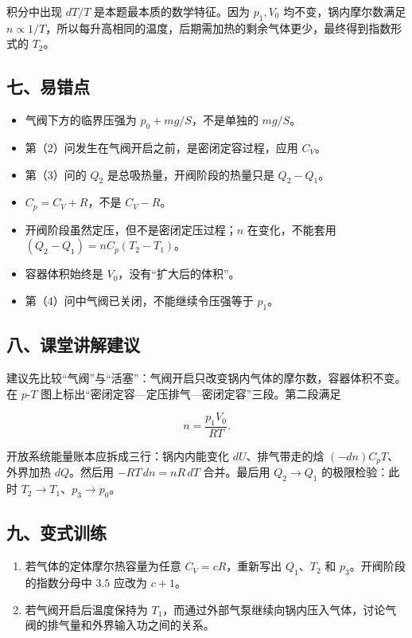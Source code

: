 \documentclass[12pt,a4paper,UTF8]{ctexart}
\newcommand{\tightlist}{\setlength{\itemsep}{0pt}\setlength{\parskip}{0pt}}
\begin{document}
积分中出现 \(dT/T\) 是本题最本质的数学特征。因为 \(p_1,V_0\)
均不变，锅内摩尔数满足
\(n\propto1/T\)，所以每升高相同的温度，后期需加热的剩余气体更少，最终得到指数形式的
\(T_2\)。

\subsection{七、易错点}\label{ux4e03ux6613ux9519ux70b9-5}

\begin{itemize}
\tightlist
\item
  气阀下方的临界压强为 \(p_0+mg/S\)，不是单独的 \(mg/S\)。
\item
  第（2）问发生在气阀开启之前，是密闭定容过程，应用 \(C_V\)。
\item
  第（3）问的 \(Q_2\) 是总吸热量，开阀阶段的热量只是 \(Q_2-Q_1\)。
\item
  \(C_p=C_V+R\)，不是 \(C_V-R\)。
\item
  开阀阶段虽然定压，但不是密闭定压过程；\(n\) 在变化，不能套用
  \((Q_2-Q_1)=nC_p(T_2-T_1)\)。
\item
  容器体积始终是 \(V_0\)，没有``扩大后的体积''。
\item
  第（4）问中气阀已关闭，不能继续令压强等于 \(p_1\)。
\end{itemize}

\subsection{八、课堂讲解建议}\label{ux516bux8bfeux5802ux8bb2ux89e3ux5efaux8bae-5}

建议先比较``气阀''与``活塞''：气阀开启只改变锅内气体的摩尔数，容器体积不变。在
\(p\)-\(T\) 图上标出``密闭定容---定压排气---密闭定容''三段。第二段满足

\[n=\frac{p_1V_0}{RT}.\]

开放系统能量账本应拆成三行：锅内内能变化 \(dU\)、排气带走的焓
\((-dn)C_pT\)、外界加热 \(dQ\)。然后用 \(-RT\,dn=nR\,dT\) 合并。最后用
\(Q_2\to Q_1\) 的极限检验：此时 \(T_2\to T_1\)、\(p_3\to p_0\)。

\subsection{九、变式训练}\label{ux4e5dux53d8ux5f0fux8badux7ec3-5}

\begin{enumerate}
\def\labelenumi{\arabic{enumi}.}
\tightlist
\item
  若气体的定体摩尔热容量为任意 \(C_V=cR\)，重新写出 \(Q_1\)、\(T_2\) 和
  \(p_3\)。开阀阶段的指数分母中 \(3.5\) 应改为 \(c+1\)。
\item
  若气阀开启后温度保持为
  \(T_1\)，而通过外部气泵继续向锅内压入气体，讨论气阀的排气量和外界输入功之间的关系。
\end{enumerate}
\end{document}
